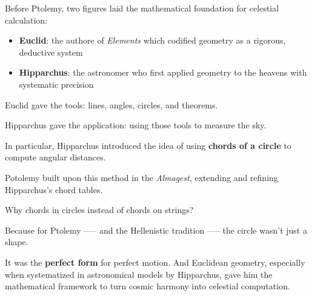 \begin{tcolorbox}[colback=blue!5!white, colframe=blue!50!black, breakable,
    title={Historical Sidebar: Why Ptolemy Used Chords in Circles — The Legacy of Euclid and Hipparchus}]
    
    Before Ptolemy, two figures laid the mathematical foundation for celestial calculation:

    \medskip

    \begin{itemize}
        \item \textbf{Euclid}: the authore of \textit{Elements} which codified geometry as a rigorous, deductive system 
        \item \textbf{Hipparchus}: the astronomer who first applied geometry to the heavens with systematic precision
    \end{itemize}
    
    \medskip
    
    Euclid gave the tools: lines, angles, circles, and theorems.  

    \medskip

    Hipparchus gave the application: using those tools to measure the sky.

    \medskip
    
    In particular, Hipparchus introduced the idea of using \textbf{chords of a circle} to compute angular distances.  
    
    

    \medskip
    
    Potolemy built upon this method in the \textit{Almagest}, extending and refining Hipparchus’s chord tables.
    
    \medskip
    
    Why chords in circles instead of chords on strings?

    \medskip
    
    Because for Ptolemy —-- and the Hellenistic tradition —-- the circle wasn’t just a shape.  

    \medskip
    It was the \textbf{perfect form} for perfect motion.  And Euclidean geometry, especially when systematized in astronomical models by Hipparchus, gave him the mathematical framework to turn cosmic harmony into celestial computation.
    
    
\end{tcolorbox}



